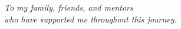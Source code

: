 \thispagestyle{empty}
\vspace*{\fill}
\begin{center}
    \large\itshape
    To my family, friends, and mentors\\
    who have supported me throughout this journey.
\end{center}
\vspace*{\fill}
\clearpage 